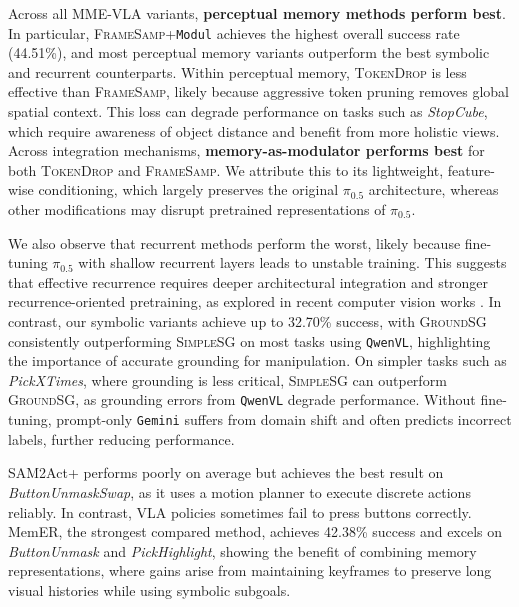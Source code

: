 Across all MME-VLA variants, \textbf{perceptual memory methods perform best}. In particular, \textsc{FrameSamp}+\texttt{Modul} achieves the highest overall success rate (44.51\%), and most perceptual memory variants outperform the best symbolic and recurrent counterparts. Within perceptual memory, \textsc{TokenDrop} is less effective than \textsc{FrameSamp}, likely because aggressive token pruning removes global spatial context. This loss can degrade performance on tasks such as \textit{StopCube}, which require awareness of object distance and benefit from more holistic views.
Across integration mechanisms, \textbf{memory-as-modulator performs best} for both \textsc{TokenDrop} and \textsc{FrameSamp}. We attribute this to its lightweight, feature-wise conditioning, which largely preserves the original $\pi_{0.5}$ architecture, whereas other   modifications may disrupt pretrained representations of $\pi_{0.5}$.

We also observe that recurrent methods perform the worst, likely because fine-tuning $\pi_{0.5}$ with shallow recurrent layers leads to unstable training. This suggests that effective recurrence requires deeper architectural integration and stronger recurrence-oriented pretraining, as explored in recent computer vision works \cite{zhang2025test, wang2026tttlrm}.
In contrast, our symbolic variants achieve up to 32.70\% success, with \textsc{GroundSG} consistently outperforming \textsc{SimpleSG} on most tasks using \texttt{QwenVL}, highlighting the importance of accurate grounding for manipulation.
On simpler tasks such as \textit{PickXTimes}, where grounding is less critical, \textsc{SimpleSG} can outperform \textsc{GroundSG}, as grounding errors from \texttt{QwenVL} degrade performance.
Without fine-tuning, prompt-only \texttt{Gemini} suffers from domain shift and often predicts incorrect labels, further reducing performance.

SAM2Act+ performs poorly on average but achieves the best result on \textit{ButtonUnmaskSwap}, as it uses a motion planner to execute discrete actions reliably. %
In contrast, VLA policies sometimes fail to press buttons correctly.
MemER, the strongest compared method, achieves 42.38\% success and excels on \textit{ButtonUnmask} and \textit{PickHighlight}, showing the benefit of combining  memory representations, where gains arise from maintaining keyframes to preserve long visual histories while using symbolic subgoals.


